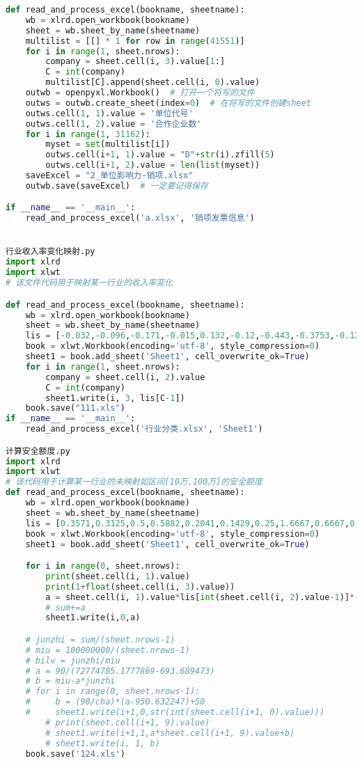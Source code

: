 \documentclass[withoutpreface,bwprint]{cumcmthesis}
\begin{document}
\begin{appendices}
\begin{lstlisting}[language=python]
def read_and_process_excel(bookname, sheetname):
    wb = xlrd.open_workbook(bookname)
    sheet = wb.sheet_by_name(sheetname)
    multilist = [[] * 1 for row in range(41551)]
    for i in range(1, sheet.nrows):
        company = sheet.cell(i, 3).value[1:]
        C = int(company)
        multilist[C].append(sheet.cell(i, 0).value)
    outwb = openpyxl.Workbook()  # 打开一个将写的文件
    outws = outwb.create_sheet(index=0)  # 在将写的文件创建sheet
    outws.cell(1, 1).value = '单位代号'
    outws.cell(1, 2).value = '合作企业数'
    for i in range(1, 31162):
        myset = set(multilist[i])
        outws.cell(i+1, 1).value = "D"+str(i).zfill(5)
        outws.cell(i+1, 2).value = len(list(myset))
    saveExcel = "2_单位影响力-销项.xlsx"
    outwb.save(saveExcel)  # 一定要记得保存

if __name__ == '__main__':
    read_and_process_excel('a.xlsx', '销项发票信息')


行业收入率变化映射.py
import xlrd
import xlwt
# 该文件代码用于映射某一行业的收入率变化

def read_and_process_excel(bookname, sheetname):
    wb = xlrd.open_workbook(bookname)
    sheet = wb.sheet_by_name(sheetname)
    lis = [-0.032,-0.096,-0.171,-0.015,0.132,-0.12,-0.443,-0.3753,-0.122,0.019]
    book = xlwt.Workbook(encoding='utf-8', style_compression=0)
    sheet1 = book.add_sheet('Sheet1', cell_overwrite_ok=True)
    for i in range(1, sheet.nrows):
        company = sheet.cell(i, 2).value
        C = int(company)
        sheet1.write(i, 3, lis[C-1])
    book.save("111.xls")
if __name__ == '__main__':
    read_and_process_excel('行业分类.xlsx', 'Sheet1')

计算安全额度.py
import xlrd
import xlwt
# 该代码用于计算某一行业的未映射如区间[10万,100万]的安全额度
def read_and_process_excel(bookname, sheetname):
    wb = xlrd.open_workbook(bookname)
    sheet = wb.sheet_by_name(sheetname)
    lis = [0.3571,0.3125,0.5,0.5882,0.2041,0.1429,0.25,1.6667,0.6667,0.5]
    book = xlwt.Workbook(encoding='utf-8', style_compression=0)
    sheet1 = book.add_sheet('Sheet1', cell_overwrite_ok=True)

    for i in range(0, sheet.nrows):
        print(sheet.cell(i, 1).value)
        print(1+float(sheet.cell(i, 3).value))
        a = sheet.cell(i, 1).value*lis[int(sheet.cell(i, 2).value-1)]*(1+float(sheet.cell(i, 3).value))
        # sum+=a
        sheet1.write(i,0,a)

    # junzhi = sum/(sheet.nrows-1)
    # miu = 100000000/(sheet.nrows-1)
    # bilv = junzhi/miu
    # a = 90/(72774785.1777869-693.689473)
    # b = miu-a*junzhi
    # for i in range(0, sheet.nrows-1):
    #     b = (90/cha)*(a-950.632247)+50
    #     sheet1.write(i+1,0,str(int(sheet.cell(i+1, 0).value)))
        # print(sheet.cell(i+1, 9).value)
        # sheet1.write(i+1,1,a*sheet.cell(i+1, 9).value+b)
        # sheet1.write(i, 1, b)
    book.save('124.xls')


\end{lstlisting}
\end{appendices}
\end{document}
